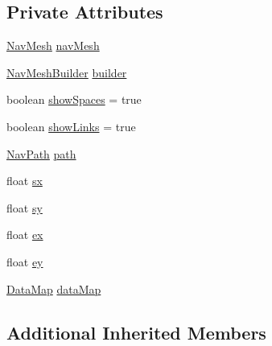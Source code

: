 \subsection*{Private Attributes}
\begin{DoxyCompactItemize}
\item 
\mbox{\hyperlink{classorg_1_1newdawn_1_1slick_1_1util_1_1pathfinding_1_1navmesh_1_1_nav_mesh}{Nav\+Mesh}} \mbox{\hyperlink{classorg_1_1newdawn_1_1slick_1_1tests_1_1_nav_mesh_test_ace6b60ed5b38856dd1f8bdfe44f09df5}{nav\+Mesh}}
\item 
\mbox{\hyperlink{classorg_1_1newdawn_1_1slick_1_1util_1_1pathfinding_1_1navmesh_1_1_nav_mesh_builder}{Nav\+Mesh\+Builder}} \mbox{\hyperlink{classorg_1_1newdawn_1_1slick_1_1tests_1_1_nav_mesh_test_a35070b13da5425ae0c75b8b0a6295560}{builder}}
\item 
boolean \mbox{\hyperlink{classorg_1_1newdawn_1_1slick_1_1tests_1_1_nav_mesh_test_a786e92a28b21e3b89be1ad5bd4ccac66}{show\+Spaces}} = true
\item 
boolean \mbox{\hyperlink{classorg_1_1newdawn_1_1slick_1_1tests_1_1_nav_mesh_test_a9772bf7261a81d51464c164952f994f6}{show\+Links}} = true
\item 
\mbox{\hyperlink{classorg_1_1newdawn_1_1slick_1_1util_1_1pathfinding_1_1navmesh_1_1_nav_path}{Nav\+Path}} \mbox{\hyperlink{classorg_1_1newdawn_1_1slick_1_1tests_1_1_nav_mesh_test_a1d8b7d82c69d87b48a603142ba5b82b2}{path}}
\item 
float \mbox{\hyperlink{classorg_1_1newdawn_1_1slick_1_1tests_1_1_nav_mesh_test_a4bb1c0219a793c518dca30321c07e416}{sx}}
\item 
float \mbox{\hyperlink{classorg_1_1newdawn_1_1slick_1_1tests_1_1_nav_mesh_test_a0408edee105a746df1656e6aa53c2b2a}{sy}}
\item 
float \mbox{\hyperlink{classorg_1_1newdawn_1_1slick_1_1tests_1_1_nav_mesh_test_ad59581bcb5394db18aa289514c2b33b6}{ex}}
\item 
float \mbox{\hyperlink{classorg_1_1newdawn_1_1slick_1_1tests_1_1_nav_mesh_test_ab451abcf0d2f2ec860f2e2e1e54246d0}{ey}}
\item 
\mbox{\hyperlink{classorg_1_1newdawn_1_1slick_1_1tests_1_1_nav_mesh_test_1_1_data_map}{Data\+Map}} \mbox{\hyperlink{classorg_1_1newdawn_1_1slick_1_1tests_1_1_nav_mesh_test_a84ece3e98cbbb51e7de137f17001c02e}{data\+Map}}
\end{DoxyCompactItemize}
\subsection*{Additional Inherited Members}


